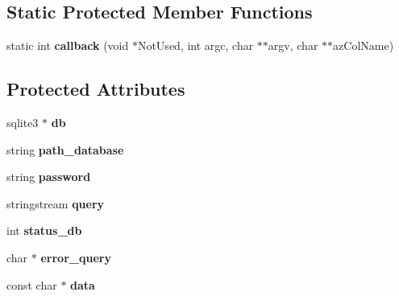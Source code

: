 \subsection*{Static Protected Member Functions}
\begin{DoxyCompactItemize}
\item 
static int {\bfseries callback} (void $\ast$Not\+Used, int argc, char $\ast$$\ast$argv, char $\ast$$\ast$az\+Col\+Name)\hypertarget{classSQLite_a2cdec2824226fb74b9c5f53fb2eb9c52}{}\label{classSQLite_a2cdec2824226fb74b9c5f53fb2eb9c52}

\end{DoxyCompactItemize}
\subsection*{Protected Attributes}
\begin{DoxyCompactItemize}
\item 
sqlite3 $\ast$ {\bfseries db}\hypertarget{classSQLite_a1d24b48aa333500d31dd1741c474ee77}{}\label{classSQLite_a1d24b48aa333500d31dd1741c474ee77}

\item 
string {\bfseries path\+\_\+database}\hypertarget{classSQLite_a35c90bc05faa587c66031661a365db20}{}\label{classSQLite_a35c90bc05faa587c66031661a365db20}

\item 
string {\bfseries password}\hypertarget{classSQLite_a5db7ea6ca4da520fb5125631b081acb9}{}\label{classSQLite_a5db7ea6ca4da520fb5125631b081acb9}

\item 
stringstream {\bfseries query}\hypertarget{classSQLite_a524b7fb749c55eae9076981de81f6576}{}\label{classSQLite_a524b7fb749c55eae9076981de81f6576}

\item 
int {\bfseries status\+\_\+db}\hypertarget{classSQLite_ab54d46b70b16ac3d91631c926d633d42}{}\label{classSQLite_ab54d46b70b16ac3d91631c926d633d42}

\item 
char $\ast$ {\bfseries error\+\_\+query}\hypertarget{classSQLite_a641bc6c63769eee5ab03dfd0cd26f0bc}{}\label{classSQLite_a641bc6c63769eee5ab03dfd0cd26f0bc}

\item 
const char $\ast$ {\bfseries data}\hypertarget{classSQLite_a7c608c690c08fce28810d549ab488074}{}\label{classSQLite_a7c608c690c08fce28810d549ab488074}

\end{DoxyCompactItemize}


